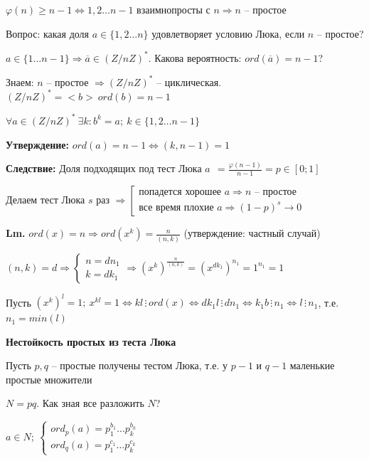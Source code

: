 \documentclass[14pt, letter paper]{article}
\begin{document}
$\varphi(n) \geq n - 1 \Leftrightarrow 1, 2 \ldots n-1$ взаимнопросты с $n \Rightarrow n$ -- простое

\vspace{5mm}

Вопрос: какая доля $a \in \{1, 2 \ldots n\}$ удовлетворяет условию Люка, если $n$ -- простое?

$a \in \{1 \ldots n-1\} \Rightarrow \overline{a} \in (Z/nZ)^*$. Какова вероятность: $ord(\overline{a}) = n - 1$?

\vspace{5mm}

Знаем: $n$ -- простое $\Rightarrow (Z/nZ)^*$ -- циклическая. $(Z/nZ)^* = <b>\ ord(b) = n - 1$

$\forall a \in (Z/nZ)^*\ \exists k : b^k = a;\ k \in \{1, 2 \ldots n-1\}$

\textbf{Утверждение:} $ord(a) = n - 1 \Leftrightarrow (k, n-1) = 1$

\textbf{Следствие:} Доля подходящих под тест Люка $a\ \ = \frac{\varphi(n-1)}{n-1} = p \in [0; 1]$

Делаем тест Люка $s$ раз $\Rightarrow \left[ \begin{gathered}
    \text{попадется хорошее } a \Rightarrow n \text{ -- простое} \\
    \text{все время плохие } a \Rightarrow (1-p)^s \rightarrow 0
\end{gathered} \right.$

\textbf{Lm.} $ord(x) = n \Rightarrow ord(x^k) = \frac{n}{(n, k)}$ (утверждение: частный случай)

$(n, k) = d \Rightarrow \begin{cases}
    n = dn_1 \\
    k = dk_1
\end{cases} \Rightarrow (x^k)^\frac{n}{(n,k)} = (x^{dk_1})^{n_1} = 1^{n_1} = 1$

Пусть $(x^k)^l = 1;\ x^{kl} = 1 \Leftrightarrow kl \, \vdots \, ord(x) \Leftrightarrow dk_1l \, \vdots \, dn_1 \Leftrightarrow k_1b \, \vdots \, n_1 \Leftrightarrow l \, \vdots \, n_1$, т.е. $n_1 = min(l)$

\vspace{5mm}

\textbf{Нестойкость простых из теста Люка}

Пусть $p, q$ -- простые получены тестом Люка, т.е. у $p - 1$ и $q - 1$ маленькие простые множители

$N = pq$. Как зная все разложить $N$?

$a \in N;\ \begin{cases}
    ord_p(a) = p_1^{b_1}\ldots p_k^{b_k} \\
    ord_q(a) = p_1^{c_1}\ldots p_k^{c_k}
\end{cases}$
\end{document}
